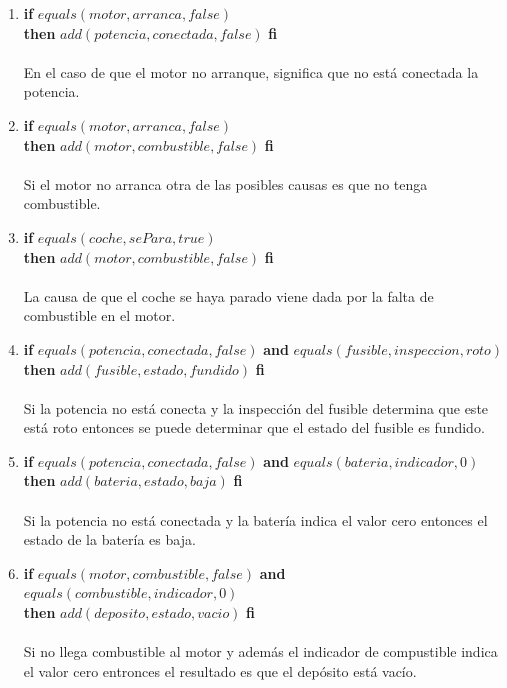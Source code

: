 \documentclass[10pt, a4paper,spanish]{article}
\begin{document}
		\begin{enumerate}[label={\textbf{R\theenumi:}}]

			\item
				\textbf{if} $equals(motor, arranca, false)$ \\
				\textbf{then} $add(potencia, conectada, false)$ \textbf{fi}
				\\ \\
				En el caso de que el motor no arranque, significa que no está conectada la potencia.

			\item
				\textbf{if} $equals(motor, arranca, false)$ \\
				\textbf{then} $add(motor, combustible, false)$ \textbf{fi}
				\\ \\
				Si el motor no arranca otra de las posibles causas es que no tenga combustible.

			\item
				\textbf{if} $equals(coche, sePara, true)$ \\
				\textbf{then} $add(motor, combustible, false)$ \textbf{fi}
				\\ \\
				La causa de que el coche se haya parado viene dada por la falta de combustible en el motor.

			\item
				\textbf{if} $equals(potencia, conectada, false)$ \textbf{and} $equals(fusible, inspeccion, roto)$ \\
				\textbf{then} $add(fusible, estado, fundido)$ \textbf{fi}
				\\ \\
				Si la potencia no está conecta y la inspección del fusible determina que este está roto entonces se puede determinar que el estado del fusible es fundido.

			\item
				\textbf{if} $equals(potencia, conectada, false)$ \textbf{and} $equals(bateria, indicador, 0)$ \\
				\textbf{then} $add(bateria, estado, baja)$ \textbf{fi}
				\\ \\
				Si la potencia no está conectada y la batería indica el valor cero entonces el estado de la batería es baja.

			\item
				\textbf{if} $equals(motor, combustible, false)$ \textbf{and} $equals(combustible, indicador, 0)$ \\
				\textbf{then} $add(deposito, estado, vacio)$ \textbf{fi}
				\\ \\
				Si no llega combustible al motor y además el indicador de compustible indica el valor cero entronces el resultado es que el depósito está vacío.


		\end{enumerate}
\end{document}
